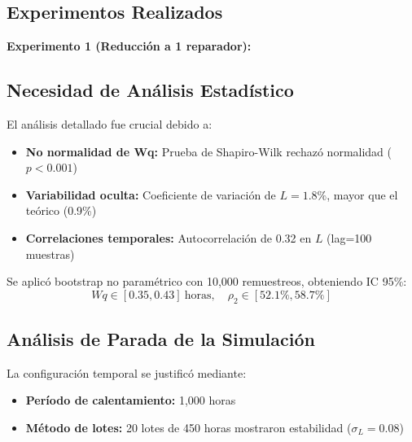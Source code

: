 \documentclass[12pt, a4paper]{article}
\begin{document}
\subsection{Experimentos Realizados}

\textbf{Experimento 1 (Reducción a 1 reparador):}



\subsection{Necesidad de Análisis Estadístico}
El análisis detallado fue crucial debido a:
\begin{itemize}
    \item \textbf{No normalidad de Wq:} Prueba de Shapiro-Wilk rechazó normalidad ($p < 0.001$)
    \item \textbf{Variabilidad oculta:} Coeficiente de variación de $L = 1.8\%$, mayor que el teórico (0.9\%)
    \item \textbf{Correlaciones temporales:} Autocorrelación de 0.32 en $L$ (lag=100 muestras)
\end{itemize}

Se aplicó bootstrap no paramétrico con 10,000 remuestreos, obteniendo IC 95\%:
\begin{equation}
    Wq \in [0.35, 0.43] \ \text{horas}, \quad \rho_2 \in [52.1\%, 58.7\%]
\end{equation}

\subsection{Análisis de Parada de la Simulación}
La configuración temporal se justificó mediante:
\begin{itemize}
    \item \textbf{Período de calentamiento:} 1,000 horas
    
    \item \textbf{Método de lotes:} 20 lotes de 450 horas mostraron estabilidad ($\sigma_{L} = 0.08$)
    
\end{itemize}
\end{document}
